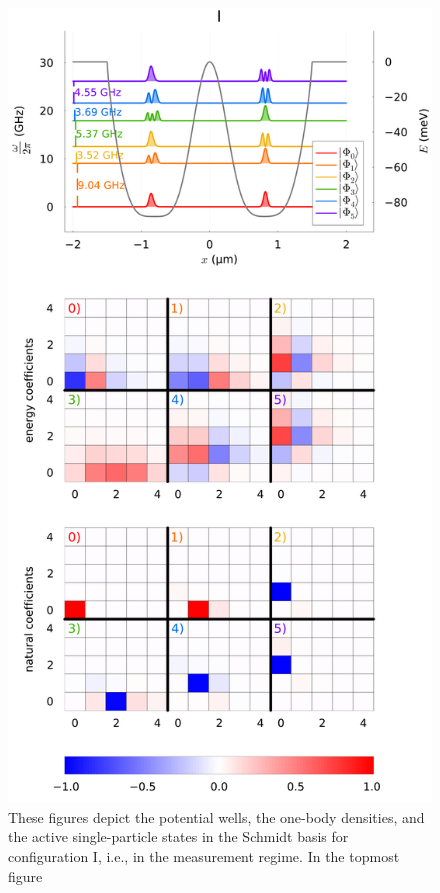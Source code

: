 \documentclass[twocolumn,superscriptaddress,unsortedaddress,
 amsmath,amssymb,
 aps,
]{revtex4-2}
\begin{document}
    \begin{figure}
        \includegraphics[width=\columnwidth]{figures/figure3_Ib_full.pdf}
        \caption{\label{fig:configuration-I}These figures depict the potential wells, the one-body
        densities, and the active single-particle states in the Schmidt basis for configuration I,
        i.e., in the measurement regime.
        In the topmost figure %
}
\end{figure}
\end{document}
